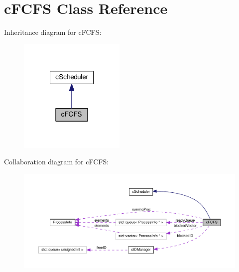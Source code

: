 \hypertarget{classcFCFS}{\section{c\-F\-C\-F\-S \-Class \-Reference}
\label{d6/dc3/classcFCFS}
}


\-Inheritance diagram for c\-F\-C\-F\-S\-:\nopagebreak
\begin{figure}[H]
\begin{center}
\leavevmode
\includegraphics[width=144pt]{d2/d94/classcFCFS__inherit__graph}
\end{center}
\end{figure}


\-Collaboration diagram for c\-F\-C\-F\-S\-:\nopagebreak
\begin{figure}[H]
\begin{center}
\leavevmode
\includegraphics[width=350pt]{d4/d8d/classcFCFS__coll__graph}
\end{center}
\end{figure}
